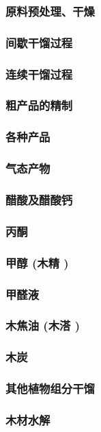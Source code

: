 \documentclass[UTF8]{../../ApplicationUniverse}
\begin{document}
            \subsubsection{原料预处理、干燥}
            \subsubsection{间歇干馏过程}
            \subsubsection{连续干馏过程}
            \subsubsection{粗产品的精制}
        \subsubsection{各种产品}
            \subsubsection{气态产物}
            \subsubsection{醋酸及醋酸钙}
            \subsubsection{丙酮}
            \subsubsection{甲醇 (木精 )}
            \subsubsection{甲醛液}
            \subsubsection{木焦油 (木溚 )}
            \subsubsection{木炭}
        \subsubsection{其他植物组分干馏}
    \subsubsection{木材水解}
\end{document}
